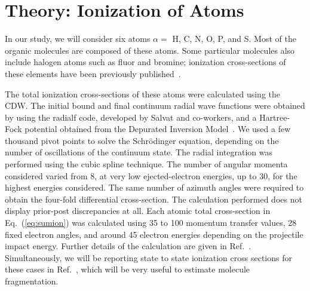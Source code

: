 \documentclass[preprint,12pt]{article}
\begin{document}
\section{Theory: Ionization of Atoms}

In our study, we will consider six atoms $\alpha=$ H, C, N, O, P, and S. 
Most of the organic molecules are composed of these atoms. Some 
particular molecules also include halogen atoms such as fluor and 
bromine; ionization cross-sections of these elements have been 
previously published~\cite{miraglia2008,miraglia2009}.

The total ionization cross-sections of these atoms were calculated using 
the CDW. The initial bound and final continuum radial wave functions 
were obtained by using the {\sc radialf} code, developed by Salvat and 
co-workers, and a Hartree-Fock potential obtained from the Depurated 
Inversion Model~\cite{mendez2016,mendez2018}. 
We used a few thousand pivot points to solve the Schr\"{o}dinger 
equation, depending on the number of oscillations of the continuum 
state. The radial integration was performed using the 
cubic spline technique. The number of angular momenta considered 
varied from 8, at very low ejected-electron energies, up to 30, 
for the highest energies considered. The same number of azimuth 
angles were required to obtain the four-fold differential 
cross-section. The calculation performed does not display prior-post 
discrepancies at all. Each atomic total cross-section in 
Eq.~(\ref{eq:sumion}) was calculated using 35 to 100 momentum transfer 
values, 28 fixed electron angles, and around 45 electron energies 
depending on the projectile impact energy. Further details of the 
calculation are given in Ref.~\cite{montanari2017}. Simultaneously, we 
will be reporting state to state ionization cross sections for these 
cases in Ref.~\cite{miraglia2019}, which will be very useful to estimate 
molecule fragmentation.
\end{document}
